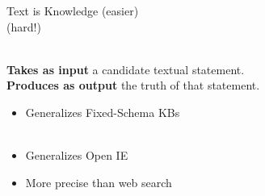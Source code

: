 \begin{frame}{Text is Knowledge}
 (easier) \\
 (hard!)  \\
\vspace{2ex}
\pause

 \\
\hspace{2ex}\textbf{Takes as input} a candidate textual statement. \\
\hspace{2ex}\textbf{Produces as output} the truth of that statement. \\
\vspace{1ex}
\pause

\begin{itemize}
\item Generalizes Fixed-Schema KBs \\
       \\
\pause
\item Generalizes Open IE \\
\pause
\item More precise than web search \\
\end{itemize}




\end{frame}
